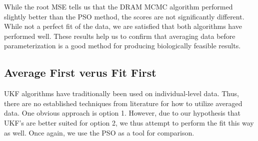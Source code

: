 \documentclass{article}
\begin{document}
While the root MSE tells us that the DRAM MCMC algorithm performed slightly better than the PSO method, the scores are not significantly different. While not a perfect fit of the data, we are satisfied that both algorithms have performed well. These results help us to confirm that averaging data before parameterization is a good method for producing biologically feasible results.
\subsection{Average First verus Fit First}
UKF algorithms have traditionally been used on individual-level data. Thus, there are no established techniques from literature for how to utilize averaged data. One obvious approach is option 1. However, due to our hypothesis that UKF's are better suited for option 2, we thus attempt to perform the fit this way as well. Once again, we use the PSO as a tool for comparison.
\end{document}
